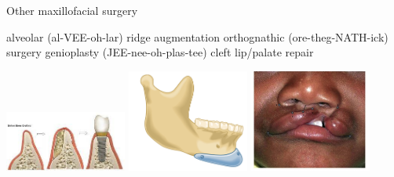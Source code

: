 \documentclass[
paper=landscape,
paper=160mm:90mm, %
fontsize=11pt, %
pagesize, %
parskip=half-, %
]{scrartcl} %
\theoremstyle{mythmstyle} %
\newcommand{\comm}[1]{} %
\begin{document}
{\begin{outline}
\end{outline}
\clearpage



\begin{outline}
\0 Other maxillofacial surgery

\1 alveolar (al-VEE-oh-lar) ridge augmentation
\1 orthognathic (ore-theg-NATH-ick) surgery
    \2 genioplasty (JEE-nee-oh-plas-tee)
\1 cleft lip/palate repair
\end{outline}
\includegraphics[width=4cm]{ridge_augmentation.png}
\includegraphics[width=4cm]{genioplasty.png}
\includegraphics[width=4cm]{cleft.png}

\clearpage

} %
\end{document}
